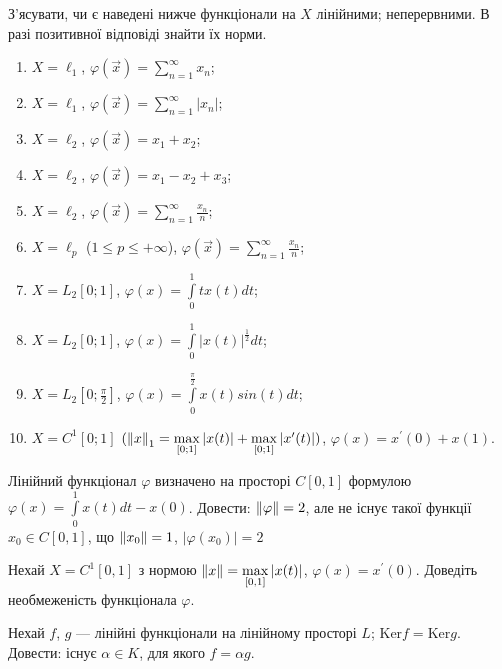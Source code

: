 \begin{exercise}\label{N:1_1_5}
    З'ясувати, чи є наведені нижче функціонали на $X$ лінійними; 
    неперервними. В разі позитивної відповіді знайти їх норми.
    \begin{enumerate}[label=\ukr*)]
        \item $X = \ell_1$, $\varphi(\vec{x}) = \sum\limits_{n=1}^{\infty} x_n $;
        \item $X = \ell_1$, $\varphi(\vec{x}) = \sum\limits_{n=1}^{\infty} |x_n| $;
        \item $X = \ell_2$, $\varphi(\vec{x}) = x_1 + x_2 $;
        \item $X = \ell_2$, $\varphi(\vec{x}) = x_1 - x_2 + x_3$;
        \item $X = \ell_2$, $\varphi(\vec{x}) = \sum\limits_{n=1}^{\infty} \frac{x_n}{n}$;
        \item $X = \ell_p$ ($1 \leq p \leq +\infty$), $\varphi(\vec{x}) = 
        \sum\limits_{n=1}^{\infty} \frac{x_n}{n}$;
        \item $X = L_2[0;1]$, $\varphi(x) = \int\limits_0^1 tx(t)dt$;
        \item $X = L_2[0;1]$, $\varphi(x) = \int\limits_0^1 |x(t)|^{\frac{1}{2}}dt$;
        \item $X = L_2[0;\frac{\pi}{2}]$,
        $\varphi(x) = \int\limits_0^{\frac{\pi}{2}} x(t)sin(t)dt$;
        \item $X = C^1[0;1]$ $(\left\lVert x\right\rVert_1 = \max\limits_{[0;1]}|x(t)| + 
        \max\limits_{[0;1]}|x^{\prime}(t)|)$, $\varphi(x) = x^{\prime}(0) + x(1)$.
    \end{enumerate}
\end{exercise}

\begin{exercise}
    Лінійний функціонал $\varphi$ визначено на просторі $C[0, 1]$ формулою 
    $\varphi(x) = \int\limits_0^1 x(t)dt - x(0)$. Довести: $\left\lVert\varphi\right\rVert = 2$, 
    але не існує такої функції $x_0 \in C[0, 1]$, що $\left\lVert x_0\right\rVert = 1$, $|\varphi(x_0)| = 2$
\end{exercise}

\begin{exercise}
    Нехай $X = C^1[0, 1]$ з нормою $\left\lVert x\right\rVert = \max\limits_{[0, 1]}|x(t)|$, 
    $\varphi(x) = x^\prime(0)$. Доведіть необмеженість функціонала $\varphi$.
\end{exercise}

\begin{exercise}
    Нехай $f$, $g$ --- лінійні функціонали на лінійному просторі $L$; $\mathrm{Ker} f = \mathrm{Ker} g$. 
    Довести: існує $\alpha \in K$, для якого $f = \alpha g$.
\end{exercise}

